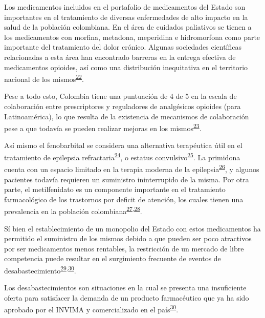 \documentclass[
]{book}
\begin{document}
Los medicamentos incluidos en el portafolio de medicamentos del Estado son importantes en el tratamiento de diversas enfermedades de alto impacto en la salud de la población colombiana. En el área de cuidados paliativos se tienen a los medicamentos con morfina, metadona, meperidina e hidromorfona como parte importante del tratamiento del dolor crónico. Algunas sociedades científicas relacionadas a esta área han encontrado barreras en la entrega efectiva de medicamentos opioides, así como una distribución inequitativa en el territorio nacional de los mismos\textsuperscript{\protect\hyperlink{ref-LeonDelgado2018}{22}}.

Pese a todo esto, Colombia tiene una puntuación de 4 de 5 en la escala de colaboración entre prescriptores y reguladores de analgésicos opioides (para Latinoamérica), lo que resulta de la existencia de mecanismos de colaboración pese a que todavía se pueden realizar mejoras en los mismos\textsuperscript{\protect\hyperlink{ref-Pastrana2020}{23}}.

Así mismo el fenobarbital se considera una alternativa terapéutica útil en el tratamiento de epilepsia refractaria\textsuperscript{\protect\hyperlink{ref-WatsonLewis2014}{24}}, o estatus convulsivo\textsuperscript{\protect\hyperlink{ref-VergaraAguilar2019}{25}}. La primidona cuenta con un espacio limitado en la terapia moderna de la epilepsia\textsuperscript{\protect\hyperlink{ref-Johannessen2020}{26}}, y algunos pacientes todavía requieren un suministro ininterrupido de la misma. Por otra parte, el metilfenidato es un componente importante en el tratamiento farmacológico de los trastornos por deficit de atención, los cuales tienen una prevalencia en la población colombiana\textsuperscript{\protect\hyperlink{ref-Pineda2001}{27},\protect\hyperlink{ref-Llanos-Lizcanoa2019}{28}}.

Sí bien el establecimiento de un monopolio del Estado con estos medicamentos ha permitido el suministro de los mismos debido a que pueden ser poco atractivos por ser medicamentos menos rentables, la restricción de un mercado de libre competencia puede resultar en el surgimiento frecuente de eventos de desabastecimiento\textsuperscript{\protect\hyperlink{ref-LopezLopez2021}{29},\protect\hyperlink{ref-INVIMA2018-Desabast}{30}}.

Los desabastecimientos son situaciones en la cual se presenta una insuficiente oferta para satisfacer la demanda de un producto farmacéutico que ya ha sido aprobado por el INVIMA y comercializado en el país\textsuperscript{\protect\hyperlink{ref-INVIMA2018-Desabast}{30}}.
\end{document}
